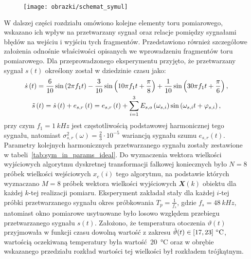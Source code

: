 \begin{figure}[htb!]
\texttt{[image: obrazki/schemat\_symul]}
\end{figure}

W dalszej części rozdziału omówiono kolejne elementy toru pomiarowego, wskazano ich wpływ na przetwarzany sygnał oraz relacje pomiędzy sygnałami błędów na wejściu i wyjściu tych fragmentów. Przedstawiono również szczegółowe założenia odnośnie właściwości opisanych we wprowadzeniu fragmentów toru pomiarowego. Dla przeprowadzonego eksperymentu przyjęto, że przetwarzany sygnał $s(t)$ określony został w dziedzinie czasu jako:
\begin{gather}
\dot{s} \left(t\right) = \frac{6}{10} \sin \left( 2 \pi f_{1} t \right) - \frac{3}{10} \sin \left( 10 \pi f_{1} t + \frac{\pi}{8} \right) + \frac{1}{10} \sin \left( 30 \pi f_{1} t + \frac{\pi}{6} \right) \label{eq:sym_in_ideal}, \\
\tilde{s} \left(t\right) = \dot{s} \left(t\right) + e_{s,r} \left(t\right) = e_{s,r} \left(t\right) + \sum _{i=1} ^{3} E_{s,o} \left(\omega_{s,i}\right) \sin \left(\omega_{s,i} t + \varphi_{s,i}\right) \label{eq:sym_in_real},
\end{gather}
przy czym $f_{1} = \qty{1}{kHz}$ jest częstotliwością podstawowej harmonicznej tego sygnału, natomiast $\sigma_{s,r}^{2}(\omega) = \frac{2}{3} \cdot 10^{-5}$ wariancją sygnału szumu $e_{s,r}(t)$. Parametry kolejnych harmonicznych przetwarzanego sygnału zostały zestawione w tabeli~\ref{tab:sym_in_params_ideal}. Do wyznaczenia wektora wielkości wyjściowych algorytmu dyskretnej transformacji falkowej koniecznych było $N = 8$ próbek wielkości wejściowych $x_{c}(i)$ tego algorytmu, na podstawie których wyznaczano $M = 8$ próbek wektora wielkości wyjściowych $\mathbfit{X}(k)$ obiektu dla każdej $k$-tej realizacji pomiaru. Eksperyment zakładał stały dla każdej $i$-tej próbki przetwarzanego sygnału okres próbkowania $T_{p} = \frac{1}{f_{s}}$, gdzie $f_{s} = \qty{48}{kHz}$, natomiast okno pomiarowe usytuowane było losowo względem przebiegu przetwarzanego sygnału $s(t)$. Założono, że temperatura otoczenia $\vartheta(t)$ przyjmowała w funkcji czasu dowolną wartość z zakresu $\hat{\vartheta}(t) \in \interval{17}{23}~\unit{\degreeCelsius}$, wartością oczekiwaną temperatury była wartość~\qty{20}{\degreeCelsius} oraz w obrębie wskazanego przedziału rozkład wartości tej wielkości był rozkładem trójkątnym.

